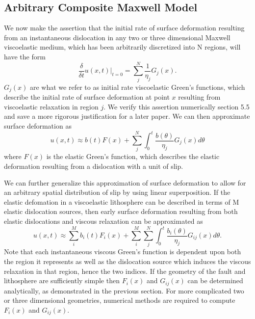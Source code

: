 \documentclass[12pt]{article}
\begin{document}
\subsection{Arbitrary Composite Maxwell Model}
We now make the assertion that the initial rate of surface deformation
resulting from an instantaneous dislocation in any two or three
dimensional Maxwell viscoelastic medium, which has been arbitrarily
discretized into N regions, will have the form
\begin{equation}\label{PostseismicInitialVelocity}
  \frac{\delta}{\delta t}u(x,t)\big|_{t=0} = \sum_j^N\frac{1}{\eta_j}G_j(x) .
\end{equation}
$G_j(x)$ are what we refer to as initial rate viscoelastic Green's
functions, which describe the initial rate of surface deformation at
point $x$ resulting from viscoelastic relaxation in region $j$.  We verify
this assertion numerically section 5.5 and save a more rigorous
justification for a later paper.  We can then approximate surface
deformation as
\begin{equation}
  u(x,t) \approx b(t)F(x) + \sum_j^N\int_0^t \frac{b(\theta)}{\eta_j}G_j(x) d\theta
\end{equation}
where $F(x)$ is the elastic Green's function, which describes the
elastic deformation resulting from a dislocation with a unit of slip.

We can further generalize this approximation of surface deformation to
allow for an arbitrary spatial distribution of slip by using linear
superposition.  If the elastic defomation in a viscoelastic
lithosphere can be described in terms of M elastic dislocation
sources, then early surface deformation resulting from both elastic
dislocations and viscous relaxation can be approximated as
\begin{equation}\label{Postseismic_Approximation}
u(x,t) \approx \sum_i^Mb_i(t)F_i(x) + 
               \sum_i^M\sum_j^N\int_0^t\frac{b_i(\theta)}{\eta_j}G_{ij}(x) d\theta.
\end{equation}
Note that each instantaneous viscous Green's function is dependent
upon both the region it represents as well as the dislocation source
which induces the viscous relaxation in that region, hence the two
indices.  If the geometry of the fault and lithosphere are
sufficiently simple then $F_i(x)$ and $G_{ij}(x)$ can be determined
analytically, as demonstrated in the previous section.  For more
complicated two or three dimensional geometries, numerical methods are
required to compute $F_i(x)$ and $G_{ij}(x)$.
\end{document}
